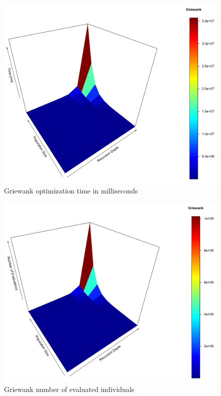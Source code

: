 \documentclass[graybox]{styles/svmult}
\begin{document}
\begin{figure}[b]
\sidecaption
\includegraphics[width=1.0\textwidth]{images/fig07}
\caption{Griewank optimization time in milliseconds}
\label{fig:14}
\end{figure}

\begin{figure}[b]
\sidecaption
\includegraphics[width=1.0\textwidth]{images/fig08}
\caption{Griewank number of evaluated individuals}
\label{fig:15}
\end{figure}
\end{document}
